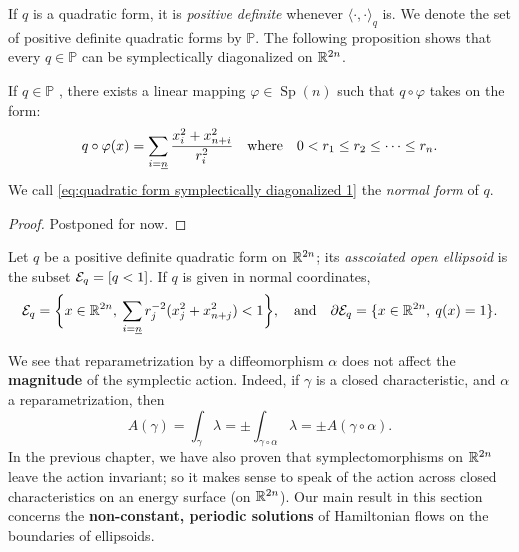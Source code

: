 \documentclass[../main-v2-manifolds.tex]{subfiles}
\begin{document}
If $q$ is a quadratic form, it is \emph{positive definite} whenever $\langle \cdot,\cdot\rangle_q$ is. We denote the set of positive definite quadratic forms by $\mathbb{P}$. The following proposition shows that every $q\in\mathbb{P}$  can be symplectically diagonalized on ${\mathbb{R}^{2n}}$. 
\begin{wts}
    If $q\in \mathbb{P}$ , there exists a linear mapping $\varphi\in\operatorname{Sp}(n)$ such that $q\circ \varphi$  takes on the form:
    \begin{equation}
    q\circ\varphi(x) = \sum_{i=\underline{n}} \frac{x_i^2 + x_{n+i}^2}{r_i^2}\qqtext{where} 0<r_1\leq r_2\leq\cdots\leq r_n.
    \label{eq:quadratic form symplectically diagonalized 1}
\end{equation}
    We call \cref{eq:quadratic form symplectically diagonalized 1} the \emph{normal form} of $q$.
\end{wts}
\begin{proof}
    Postponed for now.
\end{proof}
\begin{definition}
    Let $q$ be a positive definite quadratic form on ${\mathbb{R}^{2n}}$; its \emph{asscoiated open ellipsoid}  is the subset $\mathcal{E}_q=[q<1]$. If $q$ is given in normal coordinates,
    \[
        \Epsilon_q = \bigset{x\in\realtn,\:\sum_{i=\underline{n}} r_j^{-2}(x_j^2 + x_{n+j}^2)<1}, \qqtext{and} \partial \Epsilon_q = \{x\in\realtn, \: q(x) = 1\}.
    \]
\end{definition}
We see that reparametrization by a diffeomorphism $\alpha$ does not affect the \textbf{magnitude} of the symplectic action. Indeed, if $\gamma$ is a closed characteristic, and $\alpha$ a reparametrization, then 
\[
  A(\gamma)=\int_{\gamma}\lambda = \pm \int_{\gamma\circ\alpha}\lambda = \pm A(\gamma\circ \alpha).
\]
In the previous chapter, we have also proven that symplectomorphisms on ${\mathbb{R}^{2n}}$ leave the action invariant; so it makes sense to speak of the action across closed characteristics on an energy surface (on ${\mathbb{R}^{2n}}$). Our main result in this section concerns the \textbf{non-constant, periodic solutions} of Hamiltonian flows on the boundaries of ellipsoids. \\
\end{document}
